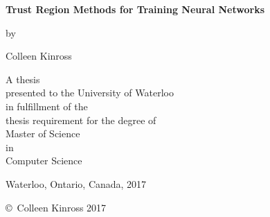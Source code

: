 \pagestyle{empty}

\begin{titlepage}
        \begin{center}
        \vspace*{1.0cm}

        \Huge
        {\bf Trust Region Methods for Training Neural Networks }

        \vspace*{1.0cm}

        \normalsize
        by \\

        \vspace*{1.0cm}

        \Large
        Colleen Kinross \\

        \vspace*{3.0cm}

        \normalsize
        A thesis \\
        presented to the University of Waterloo \\ 
        in fulfillment of the \\
        thesis requirement for the degree of \\
        Master of Science \\
        in \\
        Computer Science \\

        \vspace*{2.0cm}

        Waterloo, Ontario, Canada, 2017 \\

        \vspace*{1.0cm}

        \copyright\ Colleen Kinross 2017 \\
        \end{center}
\end{titlepage}

\pagestyle{plain}
\setcounter{page}{2}

